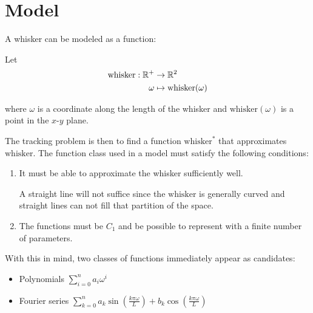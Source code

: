 \section{Model}


A whisker can be modeled as a function:



\begin{definition}
    Let 
    \begin{equation}
    \begin{split}
        \text{whisker} : \mathbb{R}^+ &\rightarrow \mathbb{R}^2 \\
                  \omega&\mapsto \text{whisker}(\omega)
    \end{split}
    \end{equation}
\end{definition}
where $\omega$ is a coordinate along the length of the whisker and
$\text{whisker}(\omega)$ is a point in the $x$-$y$ plane.

The tracking problem is then to find a function $\text{whisker}^*$
that approximates $\text{whisker}$. The function class used in a
model must satisfy the following conditions:

\begin{enumerate}
\item It must be able to approximate the whisker sufficiently
  well.

  \begin{example}
    A straight line will not suffice since the $\text{whisker}$ is
    generally curved and straight lines can not fill that partition of
    the space.
  \end{example}
  
\item The functions must be $C_1$ and be possible to represent with a
  finite number of parameters.
\end{enumerate}

With this in mind, two classes of functions immediately appear as
candidates:
\begin{itemize}
\item Polynomials $\sum_{i=0}^{n} a_i\omega^i$
\item Fourier series $\sum_{k=0}^{n} a_k\sin(\frac{k\pi\omega}{L}) +
  b_k\cos(\frac{k\pi\omega}{L})$
\end{itemize}

